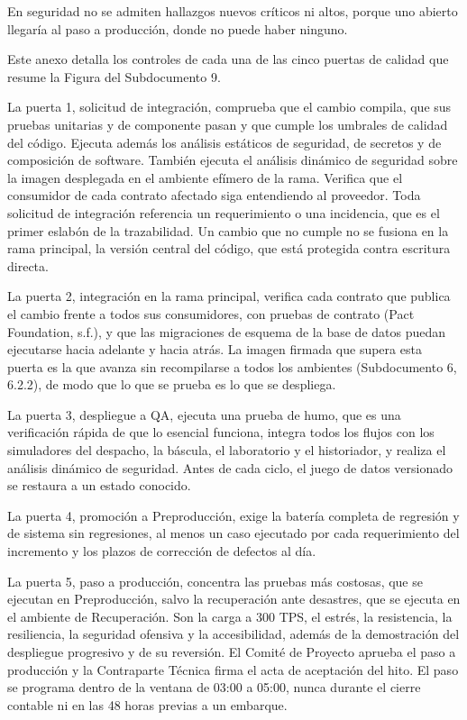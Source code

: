 \documentclass[anexo]{../../comun/overfore}
\begin{document}
En seguridad no se admiten hallazgos nuevos críticos ni altos, porque uno abierto llegaría al paso a producción, donde no puede haber ninguno.

Este anexo detalla los controles de cada una de las cinco puertas de calidad que resume la Figura  del Subdocumento 9.

La puerta 1, solicitud de integración, comprueba que el cambio compila, que sus pruebas unitarias y de componente pasan y que cumple los umbrales de calidad del código. Ejecuta además los análisis estáticos de seguridad, de secretos y de composición de software. También ejecuta el análisis dinámico de seguridad sobre la imagen desplegada en el ambiente efímero de la rama. Verifica que el consumidor de cada contrato afectado siga entendiendo al proveedor. Toda solicitud de integración referencia un requerimiento o una incidencia, que es el primer eslabón de la trazabilidad. Un cambio que no cumple no se fusiona en la rama principal, la versión central del código, que está protegida contra escritura directa.

La puerta 2, integración en la rama principal, verifica cada contrato que publica el cambio frente a todos sus consumidores, con pruebas de contrato (Pact Foundation, s.f.), y que las migraciones de esquema de la base de datos puedan ejecutarse hacia adelante y hacia atrás. La imagen firmada que supera esta puerta es la que avanza sin recompilarse a todos los ambientes (Subdocumento 6, 6.2.2), de modo que lo que se prueba es lo que se despliega.

La puerta 3, despliegue a QA, ejecuta una prueba de humo, que es una verificación rápida de que lo esencial funciona, integra todos los flujos con los simuladores del despacho, la báscula, el laboratorio y el historiador, y realiza el análisis dinámico de seguridad. Antes de cada ciclo, el juego de datos versionado se restaura a un estado conocido.

La puerta 4, promoción a Preproducción, exige la batería completa de regresión y de sistema sin regresiones, al menos un caso ejecutado por cada requerimiento del incremento y los plazos de corrección de defectos al día.

La puerta 5, paso a producción, concentra las pruebas más costosas, que se ejecutan en Preproducción, salvo la recuperación ante desastres, que se ejecuta en el ambiente de Recuperación. Son la carga a 300 TPS, el estrés, la resistencia, la resiliencia, la seguridad ofensiva y la accesibilidad, además de la demostración del despliegue progresivo y de su reversión. El Comité de Proyecto aprueba el paso a producción y la Contraparte Técnica firma el acta de aceptación del hito. El paso se programa dentro de la ventana de 03:00 a 05:00, nunca durante el cierre contable ni en las 48 horas previas a un embarque.
\end{document}
